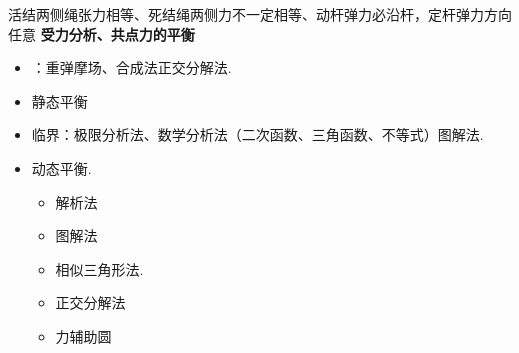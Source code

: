 活结两侧绳张力相等、死结绳两侧力不一定相等、动杆弹力必沿杆，定杆弹力方向任意
\textbf{受力分析、共点力的平衡}
\begin{itemize}
\item {}：重弹摩场、合成法\quad 正交分解法.
\item 静态平衡
\item 临界：极限分析法、数学分析法（二次函数、三角函数、不等式）\quad 图解法.
\item 动态平衡.
  \begin{itemize}
  \item 解析法
  \item 图解法
  \item 相似三角形法.
  \item 正交分解法
  \item 力辅助圆 %
  \end{itemize}
\end{itemize}
